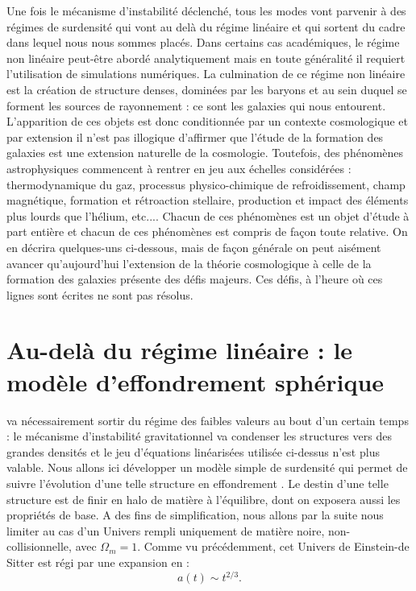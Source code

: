 Une fois le mécanisme d'instabilité déclenché, tous les modes vont parvenir à des régimes de surdensité qui vont au delà du régime linéaire et qui sortent du cadre dans lequel nous nous sommes placés. Dans certains cas académiques, le régime non linéaire peut-être abordé analytiquement mais en toute généralité il requiert l'utilisation de simulations numériques. La culmination de ce régime non linéaire est la création de structure denses, dominées par les baryons et au sein duquel se forment les sources de rayonnement : ce sont les galaxies qui nous entourent. L'apparition de ces objets est donc conditionnée par un contexte cosmologique et par extension il n'est pas illogique d'affirmer que l'étude de la formation des galaxies est une extension naturelle de la cosmologie. Toutefois, des phénomènes astrophysiques commencent à rentrer en jeu aux échelles considérées : thermodynamique du gaz, processus physico-chimique de refroidissement, champ magnétique, formation et rétroaction stellaire, production et impact des éléments plus lourds que l'hélium, etc.... Chacun de ces phénomènes est un objet d'étude à part entière et chacun de ces phénomènes est compris de façon toute relative. On en décrira quelques-uns ci-dessous, mais de façon générale on peut aisément avancer qu'aujourd'hui l'extension de la théorie cosmologique à celle de la formation des galaxies présente des défis majeurs. Ces défis, à l'heure où ces lignes sont écrites ne sont pas résolus.

\section{Au-delà du régime linéaire : le modèle d'effondrement sphérique}

 va nécessairement sortir du régime des faibles valeurs au bout d'un certain temps : le mécanisme d'instabilité gravitationnel va condenser les structures vers des grandes densités et le jeu d'équations linéarisées utilisée ci-dessus n'est plus valable. Nous allons ici développer un modèle simple de surdensité qui permet de suivre l'évolution d'une telle structure en effondrement . Le destin d'une telle structure est de finir en halo de matière à l'équilibre, dont on exposera aussi les propriétés de base. A des fins de simplification, nous allons par la suite nous limiter au cas d'un Univers rempli uniquement de matière noire, non-collisionnelle, avec $\Omega_m=1$. Comme vu précédemment, cet Univers de Einstein-de Sitter est régi par une expansion en :
\begin{equation}
a(t) \sim t^{2/3}.
\end{equation}

